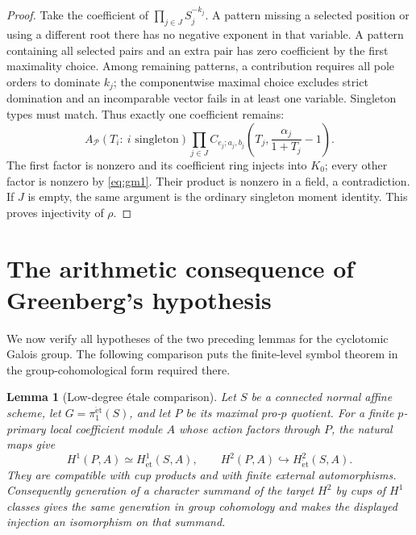 \documentclass[11pt]{article}
\newtheorem{lemma}[theorem]{Lemma}
\theoremstyle{definition}
\numberwithin{equation}{section}
\begin{document}
\begin{proof}
Take the coefficient of $\prod_{j\in J}S_j^{-k_j}$.
A pattern missing a selected position or using a different root
there has no negative exponent in that variable. A pattern
containing all selected pairs and an extra pair has zero coefficient
by the first maximality choice. Among remaining patterns, a
contribution requires all pole orders to dominate $k_j$; the
componentwise maximal choice excludes strict domination and an
incomparable vector fails in at least one variable. Singleton types
must match. Thus exactly one coefficient remains:
\begin{equation}
 A_{\mathcal P}(T_i:\ i\text{ singleton})
 \prod_{j\in J}
 C_{e_j;a_j,b_j}\left(T_j,\frac{\alpha_j}{1+T_j}-1\right).
\end{equation}
The first factor is nonzero and its coefficient ring injects into
$K_0$; every other factor is nonzero by \eqref{eq:gm1}. Their product is
nonzero in a field, a contradiction. If $J$ is empty, the same
argument is the ordinary singleton moment identity. This proves
injectivity of $\rho$.
\end{proof}


\section{The arithmetic consequence of Greenberg's hypothesis}

We now verify all hypotheses of the two preceding lemmas for the
cyclotomic Galois group. The following comparison puts the finite-level
symbol theorem in the group-cohomological form required there.
\begin{lemma}[Low-degree \'etale comparison]\label{lem:etale-prop}
Let $S$ be a connected normal affine scheme, let
$G=\pi_1^{\mathrm{\acute et}}(S)$, and let $P$ be its maximal
pro-$p$ quotient. For a finite $p$-primary local coefficient module
$A$ whose action factors through $P$, the natural maps give
\begin{equation}
 H^1(P,A)\simeq H^1_{\mathrm{\acute et}}(S,A),\qquad
 H^2(P,A)\hookrightarrow H^2_{\mathrm{\acute et}}(S,A).
\end{equation}
They are compatible with cup products and with finite external
automorphisms. Consequently generation of a character summand of
the target $H^2$ by cups of $H^1$ classes gives the same generation
in group cohomology and makes the displayed injection an
isomorphism on that summand.
\end{lemma}
\end{document}
